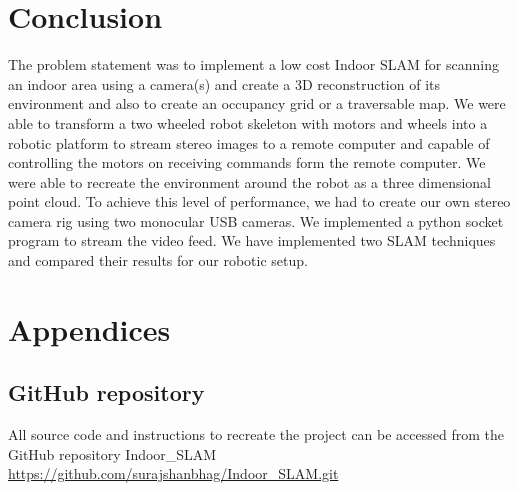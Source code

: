 \documentclass[10pt]{article}
\begin{document}
\pagebreak
\section{Conclusion}
The problem statement was to implement a low cost Indoor SLAM for scanning an indoor area using a camera(s) and create a 3D reconstruction of its environment and also to create an occupancy grid or a traversable map. We were able to transform a two wheeled robot skeleton with motors and wheels into a robotic platform to stream stereo images to a remote computer and capable of controlling the motors on receiving commands form the remote computer. We were able to recreate the environment around the robot as a three dimensional point cloud. To achieve this level of performance, we had to create our own stereo camera rig using two monocular USB cameras. We implemented a python socket program to stream the video feed. We have implemented two SLAM techniques and compared their results for our robotic setup. 
\section{Appendices}
\subsection{GitHub repository}

All source code and instructions to recreate the project can be accessed from the GitHub repository Indoor\_SLAM \href{https://github.com/surajshanbhag/Indoor\_SLAM.git}{https://github.com/surajshanbhag/Indoor\_SLAM.git}
\end{document}
